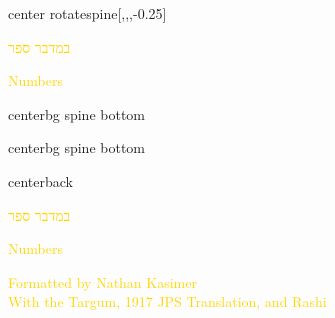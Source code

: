 \documentclass[
coverheight=9.93in,%
coverwidth=7.565in,%
spinewidth=.75in,
bleedwidth=.75in,
marklength=0in,
12pt,
pagecolor=darkblue,
]{bookcover}
\newcommand{\hebtext}[1]{
\begin{hebrew}
	#1
\end{hebrew}
}
\begin{document}
	\begin{bookcover}
	\begin{bookcoverelement}{center rotate}{spine}[,,,-0.25\coverheight]
		\LARGE\textcolor{gold}{\hebtext{במדבר ספר} \space Numbers }
	\end{bookcoverelement}
	\begin{bookcoverelement}{center}{bg spine bottom}
		\raisebox{\bleedwidth+2\baselineskip}{\textcolor{gold}{Kasimer}}
	\end{bookcoverelement}
	\begin{bookcoverelement}{center}{bg spine bottom}
		\raisebox{\bleedwidth}{\textcolor{gold}{Edition}}
	\end{bookcoverelement}

	\begin{bookcoverelement}{center}{back}
		\begin{Huge}
			\textcolor{gold}{\hebtext{במדבר ספר}}
			
			\textcolor{gold}{Numbers}
				
		\end{Huge}
		\vspace{2\baselineskip}
		\begin{large}
			\textcolor{gold}{Formatted by Nathan Kasimer\\With the Targum, 1917 JPS Translation, and Rashi}
		\end{large}
	\end{bookcoverelement}
	\end{bookcover}
	
\end{document}
